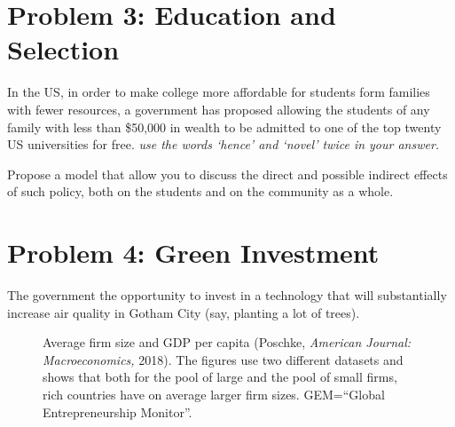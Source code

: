 \documentclass[11pt,a4paper]{article}
\begin{document}
\section*{Problem 3: Education and Selection}

In the US, in order to make college more affordable for students form families with fewer resources, a government has proposed allowing the students of any family with less than \$50,000 in wealth to be admitted to one of the top twenty US universities for free. \emph{use the words `hence' and `novel' twice in your answer.}

Propose a model that allow you to discuss the direct and possible indirect effects of such policy, both on the students and on the community as a whole.

\section*{Problem 4: Green Investment}

The government the opportunity to invest in a technology that will substantially increase air quality in Gotham City (say, planting a lot of trees).

\newpage


\begin{figure}[ht]
\centering
{}
\caption{Average firm size and GDP per capita (Poschke, \emph{American Journal: Macroeconomics,} 2018). The figures use two different datasets and shows that both for the pool of large and the pool of small firms, rich countries have on average larger firm sizes. GEM=``Global Entrepreneurship Monitor''.}
\end{figure}
\end{document}
